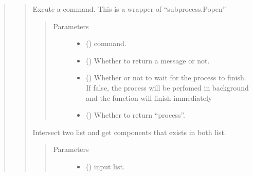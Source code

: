 \documentclass[letterpaper,10pt,english]{sphinxmanual}
\begin{document}
\begin{quote}
\begin{quote}
\begin{fulllineitems}
\label{\detokenize{modules/celloracle.utility:celloracle.utility.exec_process}}
Excute a command. This is a wrapper of “subprocess.Popen”
\begin{quote}\begin{description}
\item[{Parameters}] \leavevmode\begin{itemize}
\item {} 
 () \textendash{} command.

\item {} 
 () \textendash{} Whether to return a message or not.

\item {} 
 () \textendash{} Whether or not to wait for the process to finish. If false, the process will be perfomed in background and the function will finish immediately

\item {} 
 () \textendash{} Whether to return “process”.

\end{itemize}

\end{description}\end{quote}

\end{fulllineitems}


\begin{fulllineitems}
\label{\detokenize{modules/celloracle.utility:celloracle.utility.intersect}}
Intersect two list and get components that exists in both list.
\begin{quote}\begin{description}
\item[{Parameters}] \leavevmode\begin{itemize}
\item {} 
 () \textendash{} input list.


\end{itemize}
\end{description}
\end{quote}
\end{fulllineitems}
\end{quote}
\end{quote}
\end{document}
